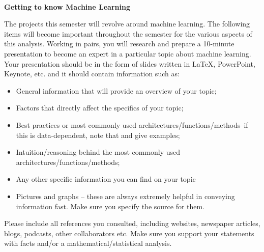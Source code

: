 \documentclass[12pt]{amsart}
\theoremstyle{definition}
\begin{document}
	
\thispagestyle{fancy}
\pagestyle{fancy}
	
	\
 
\begin{center}
    {\Large \bf {\sc Getting to know Machine Learning}}
\end{center}

The projects this semester will revolve around machine learning. The following items will become important throughout the semester for the various aspects of this analysis. Working in pairs, you will research and prepare a 10-minute presentation to become an expert in a particular topic about machine learning. Your presentation should be in the form of slides written in LaTeX, PowerPoint, Keynote, etc. and it should contain information such as:
\begin{itemize}
\item General information that will provide an overview of your topic;
\item Factors that directly affect the specifics of your topic;
\item Best practices or most commonly used architectures/functions/methods--if this is data-dependent, note that and give examples;
\item Intuition/reasoning behind the most commonly used architectures/functions/methods;
\item Any other specific information you can find on your topic
\item Pictures and graphs -- these are always extremely helpful in conveying information fast. Make sure you specify the source for them.
\end{itemize}
Please include all references you consulted, including websites, newspaper articles, blogs, podcasts, other collaborators etc. Make sure you support your statements with facts and/or a mathematical/statistical analysis. \\
\end{document}
